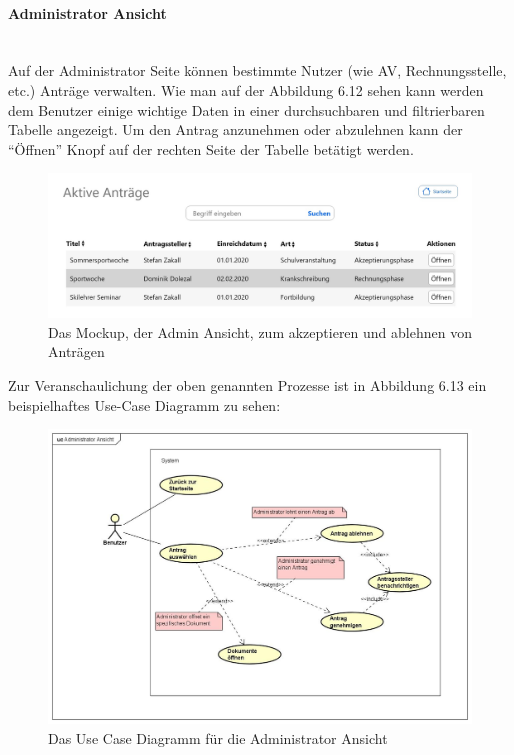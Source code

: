 \paragraph{Administrator Ansicht}
~\\
Auf der Administrator Seite können bestimmte Nutzer (wie AV, Rechnungsstelle, etc.) Anträge verwalten. Wie man auf der Abbildung 6.12 sehen kann werden dem Benutzer einige wichtige Daten in einer durchsuchbaren und filtrierbaren Tabelle angezeigt. Um den Antrag anzunehmen oder abzulehnen kann der \enquote{Öffnen} Knopf auf der rechten Seite der Tabelle betätigt werden.
\begin{figure}[H]
	\centering
	\includegraphics[width=1\linewidth]{images/Mockup-Admin}
	\caption[Mockup Adminansicht]{Das Mockup, der Admin Ansicht, zum akzeptieren und ablehnen von Anträgen}
	\label{fig:mockupAdmin}
\end{figure}
Zur Veranschaulichung der oben genannten Prozesse ist in Abbildung 6.13 ein beispielhaftes Use-Case Diagramm zu sehen: 
\begin{figure}[H]
	\centering
	\includegraphics[width=1\linewidth]{images/uc-admin}
	\caption[Use Case Diagramm Adminansicht]{Das Use Case Diagramm für die Administrator Ansicht}
	\label{fig:ucAdmin}
\end{figure}
